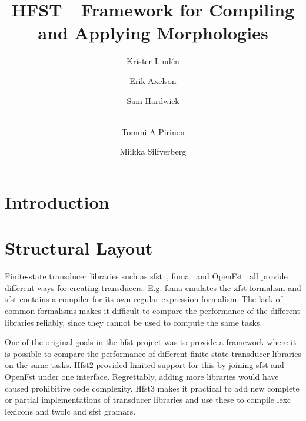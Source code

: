 \documentclass{llncs}
\begin{document}
%
\title{HFST---Framework for Compiling and Applying Morphologies}
%
\author{Krister Lind\'{e}n \and Erik Axelson \and Sam Hardwick \and\\
Tommi A Pirinen \and Miikka Silfverberg}


\maketitle


%
\begin{abstract}
\end{abstract}

\section*{Introduction}


\section{Structural Layout}

Finite-state transducer libraries such as sfst~\cite{schmid/2005},
foma~\cite{hulden/2009} and OpenFst~\cite{hulden/2009} all provide
different ways for creating transducers. E.g. foma emulates the xfst
formalism and sfst contains a compiler for its own regular expression
formalism. The lack of common formalisms makes it difficult to compare
the performance of the different libraries reliably, since they cannot
be used to compute the same tasks. 
 
One of the original goals in the hfst-project was to provide a
framework where it is possible to compare the performance of different
finite-state transducer libraries on the same tasks. Hfst2 provided
limited support for this by joining sfst and OpenFst under one
interface. Regrettably, adding more libraries would have caused
prohibitive code complexity. Hfst3 makes it practical to add new
complete or partial implementations of transducer libraries and use
these to compile lexc lexicons and twolc and sfst gramars.
\end{document}
